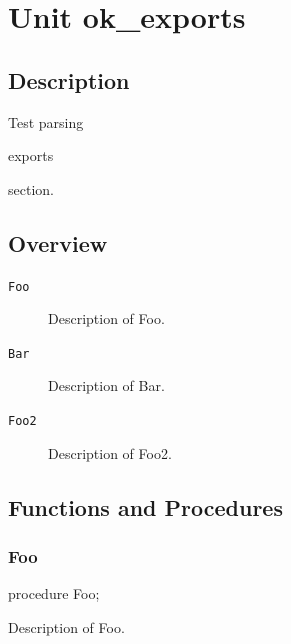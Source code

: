 \documentclass{report}
\newif\ifpdf
\begin{document}
\label{toc}\tableofcontents
\newpage
\newlength{\tmplength}
\chapter{Unit ok{\_}exports}
\label{ok_exports}
\section{Description}
Test parsing \begin{ttfamily}exports\end{ttfamily} section.
\section{Overview}
\begin{description}
\item[\texttt{Foo}]Description of Foo.
\item[\texttt{Bar}]Description of Bar.
\item[\texttt{Foo2}]Description of Foo2.
\end{description}
\section{Functions and Procedures}
\ifpdf
\subsection*{\large{\textbf{Foo}}\normalsize\hspace{1ex}\hrulefill}
\else
\subsection*{Foo}
\fi
\label{ok_exports-Foo}
\begin{list}{}{
\setlength{\itemindent}{0cm}
\setlength{\listparindent}{0cm}
\setlength{\leftmargin}{\evensidemargin}
\addtolength{\leftmargin}{\tmplength}
\settowidth{\labelsep}{X}
\addtolength{\leftmargin}{\labelsep}
\setlength{\labelwidth}{\tmplength}
}
\item[\textbf{Declaration}\hfill]
\ifpdf
\begin{flushleft}
\fi
\begin{ttfamily}
procedure Foo;\end{ttfamily}

\ifpdf
\end{flushleft}
\fi

\par
\item[\textbf{Description}]
Description of Foo.

\end{list}
\ifpdf
\end{document}
